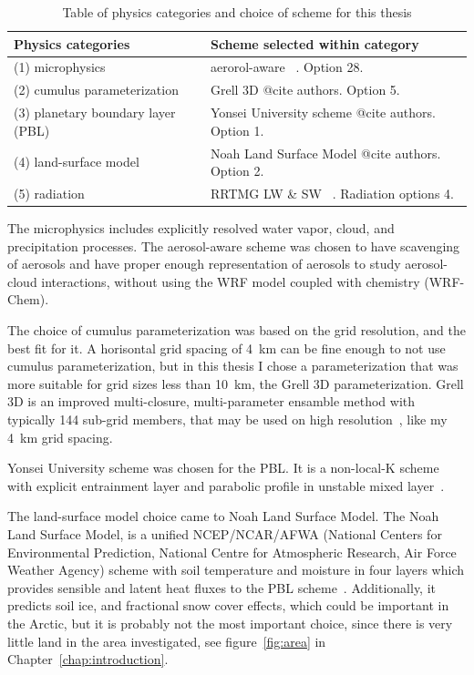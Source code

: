 \begin{table}[H]
\centering
\caption{Table of physics categories and choice of scheme for this thesis}
\label{tab:physics} 
\begin{tabular}{L{6.cm} L{6.cm}}
\centering
\textbf{Physics categories} & \textbf{Scheme selected within category}\\ \hline
(1) microphysics & aerorol-aware ~\citep{Reisner1998, Thompson2004, Thompson2008, Thompson2014}. Option 28.\\
(2) cumulus parameterization & Grell 3D  @cite authors. Option 5.\\
(3) planetary boundary layer (PBL) &  Yonsei University scheme @cite authors. Option 1.\\
(4) land-surface model & Noah Land Surface Model @cite authors. Option 2.\\
(5) radiation & RRTMG LW \& SW ~\citep{Mlawer1997, Iacono2000, Iacono2003, Iacono2008}. Radiation options 4.\\
\end{tabular}
\end{table}

The microphysics includes explicitly resolved water vapor, cloud, and precipitation processes. The aerosol-aware scheme was chosen to have scavenging of aerosols and have proper enough representation of aerosols to study aerosol-cloud interactions, without using the WRF model coupled with chemistry (WRF-Chem).

The choice of cumulus parameterization was based on the grid resolution, and the best fit for it. A horisontal grid spacing of 4~km can be fine enough to not use cumulus parameterization, but in this thesis I chose a parameterization that was more suitable for grid sizes less than 10~km, the Grell 3D parameterization. Grell 3D is an improved multi-closure, multi-parameter ensamble method with typically 144 sub-grid members, that may be used on high resolution~\citep{Wang2015}, like my 4~km grid spacing.

Yonsei University scheme was chosen for the PBL. It is a non-local-K scheme with explicit entrainment layer and parabolic profile in unstable mixed layer~\citep{Wang2015}.

The land-surface model choice came to Noah Land Surface Model. The Noah Land Surface Model, is a unified NCEP/NCAR/AFWA (National Centers for Environmental Prediction, National Centre for Atmospheric Research, Air Force Weather Agency) scheme with soil temperature and moisture in four layers which provides sensible and latent heat fluxes to the PBL scheme~\citep{Wang2015}. Additionally, it predicts soil ice, and fractional snow cover effects, which could be important in the Arctic, but it is probably not the most important choice, since there is very little land in the area investigated, see figure~\ref{fig:area} in Chapter~\ref{chap:introduction}.

